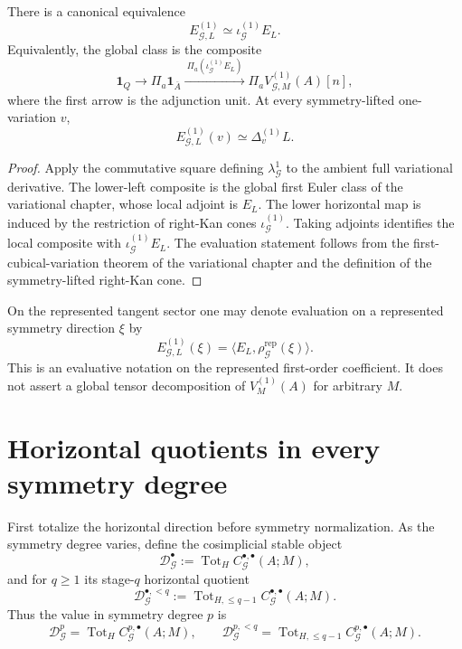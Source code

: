 \begin{proposition}
\label{prop:symmetry-noether-symmetry-euler-restriction-and-evaluation}
There is a canonical equivalence
\[
E_{\mathcal G,L}^{(1)}
\simeq
\iota_{\mathcal G}^{(1)}E_L.
\]
Equivalently, the global class is the composite
\[
\boxed{
\mathbf1_Q
\longrightarrow
\Pi_a\mathbf1_{\overline A}
\xrightarrow{\ \Pi_a(\iota_{\mathcal G}^{(1)}E_L)\ }
\Pi_aV_{\mathcal G,M}^{(1)}(A)[n],
}
\]
where the first arrow is the adjunction unit.  At every
symmetry-lifted one-variation $v$,
\[
E_{\mathcal G,L}^{(1)}(v)
\simeq
\Delta_v^{(1)}L.
\]
\end{proposition}

\begin{proof}
Apply the commutative square defining $\lambda_{\mathcal G}^1$ to the ambient full
variational derivative.  The lower-left composite is the global first Euler class
of the variational chapter, whose local adjoint is $E_L$.  The lower horizontal
map is induced by the restriction of right-Kan cones
$\iota_{\mathcal G}^{(1)}$.  Taking adjoints identifies the local composite with
$\iota_{\mathcal G}^{(1)}E_L$.  The evaluation statement follows from the
first-cubical-variation theorem of the variational chapter and the definition of
the symmetry-lifted right-Kan cone.
\end{proof}

\begin{remark}
\label{rem:symmetry-noether-pairing-notation}
On the represented tangent sector one may denote evaluation on a represented
symmetry direction $\xi$ by
\[
E_{\mathcal G,L}^{(1)}(\xi)
=
\langle E_L,\rho_{\mathcal G}^{\mathrm{rep}}(\xi)\rangle.
\]
This is an evaluative notation on the represented first-order coefficient.  It
does not assert a global tensor decomposition of $V_M^{(1)}(A)$ for arbitrary
$M$.
\end{remark}

\section{Horizontal quotients in every symmetry degree}
\label{sec:symmetry-noether-horizontal-quotients-in-every-symmetry-degree}

First totalize the horizontal direction before symmetry normalization.  As the symmetry
degree varies, define the cosimplicial stable object
\[
\mathcal D_{\mathcal G}^{\bullet}
:=
\operatorname{Tot}_H
C_{\mathcal G}^{\bullet,\bullet}(A;M),
\]
and for $q\ge1$ its stage-$q$ horizontal quotient
\[
\mathcal D_{\mathcal G}^{\bullet,<q}
:=
\operatorname{Tot}_{H,\le q-1}
C_{\mathcal G}^{\bullet,\bullet}(A;M).
\]
Thus the value in symmetry degree $p$ is
\[
\mathcal D_{\mathcal G}^{p}
=
\operatorname{Tot}_H C_{\mathcal G}^{p,\bullet}(A;M),
\qquad
\mathcal D_{\mathcal G}^{p,<q}
=
\operatorname{Tot}_{H,\le q-1}C_{\mathcal G}^{p,\bullet}(A;M).
\]

